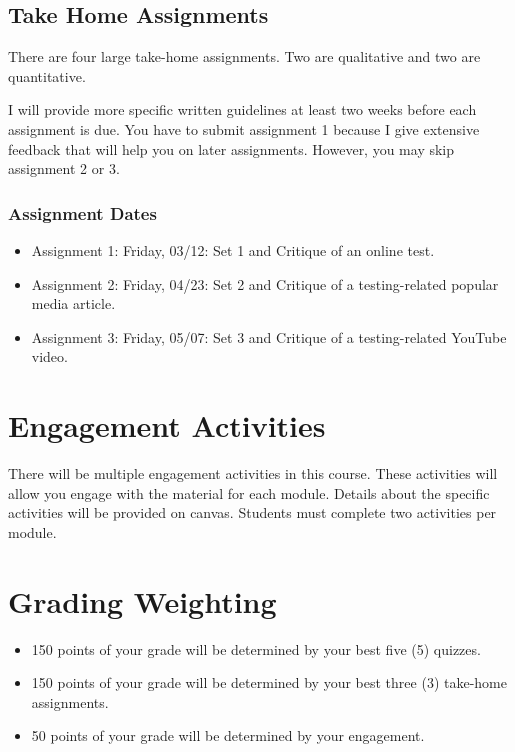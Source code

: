\documentclass[
]{book}
\providecommand{\tightlist}{%
  \setlength{\itemsep}{0pt}\setlength{\parskip}{0pt}}
\begin{document}
\subsection*{Take Home Assignments}\label{take-home-assignments}


There are four large take-home assignments. Two are qualitative and two are quantitative.

I will provide more specific written guidelines at least two weeks before each assignment is due. You have to submit assignment 1 because I give extensive feedback that will help you on later assignments. However, you may skip assignment 2 or 3.

\subsubsection*{Assignment Dates}\label{assignment-dates-1}


\begin{itemize}
\item
  Assignment 1: Friday, 03/12: Set 1 and Critique of an online test.
\item
  Assignment 2: Friday, 04/23: Set 2 and Critique of a testing-related popular media article.
\item
  Assignment 3: Friday, 05/07: Set 3 and Critique of a testing-related YouTube video.
\end{itemize}

\section*{Engagement Activities}\label{engagement-activities-2}


There will be multiple engagement activities in this course. These activities will allow you engage with the material for each module. Details about the specific activities will be provided on canvas. Students must complete two activities per module.

\section*{Grading Weighting}\label{grading-weighting-1}


\begin{itemize}
\tightlist
\item
  150 points of your grade will be determined by your best five (5) quizzes.
\item
  150 points of your grade will be determined by your best three (3) take-home assignments.
\item
  50 points of your grade will be determined by your engagement.
\end{itemize}
\end{document}

